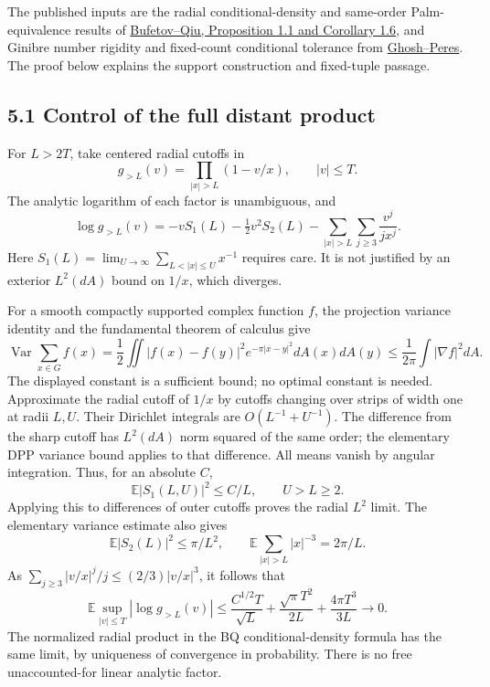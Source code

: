 \documentclass[11pt,a4paper]{article}
\theoremstyle{definition}
\theoremstyle{remark}
\numberwithin{equation}{section}
\begin{document}
The published inputs are the radial conditional-density and same-order Palm-equivalence results of \href{https://arxiv.org/html/1608.03736v2}{Bufetov--Qiu, Proposition 1.1 and Corollary 1.6}, and Ginibre number rigidity and fixed-count conditional tolerance from \href{https://arxiv.org/abs/1211.2381}{Ghosh--Peres}. The proof below explains the support construction and fixed-tuple passage.

\hypertarget{control-of-the-full-distant-product}{%
\subsection{5.1 Control of the full distant product}\label{control-of-the-full-distant-product}}

For \(L>2T\), take centered radial cutoffs in \[
g_{>L}(v)=\prod_{|x|>L}(1-v/x),\qquad |v|\le T.
\] The analytic logarithm of each factor is unambiguous, and \[
\log g_{>L}(v)=-vS_1(L)-\tfrac12v^2S_2(L)
-\sum_{|x|>L}\sum_{j\ge3}\frac{v^j}{jx^j}.
\] Here \(S_1(L)=\lim_{U\to\infty}\sum_{L<|x|\le U}x^{-1}\) requires care. It is not justified by an exterior \(L^2(dA)\) bound on \(1/x\), which diverges.

For a smooth compactly supported complex function \(f\), the projection variance identity and the fundamental theorem of calculus give \[
\operatorname{Var}\sum_{x\in G}f(x)
=\frac12\iint|f(x)-f(y)|^2e^{-\pi|x-y|^2}dA(x)dA(y)
\le\frac1{2\pi}\int|\nabla f|^2dA.
\tag{5.2}
\] The displayed constant is a sufficient bound; no optimal constant is needed. Approximate the radial cutoff of \(1/x\) by cutoffs changing over strips of width one at radii \(L,U\). Their Dirichlet integrals are \(O(L^{-1}+U^{-1})\). The difference from the sharp cutoff has \(L^2(dA)\) norm squared of the same order; the elementary DPP variance bound applies to that difference. All means vanish by angular integration. Thus, for an absolute \(C\), \[
\mathbb E|S_1(L,U)|^2\le C/L,\qquad U>L\ge2.
\] Applying this to differences of outer cutoffs proves the radial \(L^2\) limit. The elementary variance estimate also gives \[
\mathbb E|S_2(L)|^2\le\pi/L^2,\qquad
\mathbb E\sum_{|x|>L}|x|^{-3}=2\pi/L.
\] As \(\sum_{j\ge3}|v/x|^j/j\le(2/3)|v/x|^3\), it follows that \[
\mathbb E\sup_{|v|\le T}|\log g_{>L}(v)|
\le \frac{C^{1/2}T}{\sqrt L}
 +\frac{\sqrt\pi T^2}{2L}+\frac{4\pi T^3}{3L}
\longrightarrow0.
\tag{5.3}
\] The normalized radial product in the BQ conditional-density formula has the same limit, by uniqueness of convergence in probability. There is no free unaccounted-for linear analytic factor.
\end{document}

